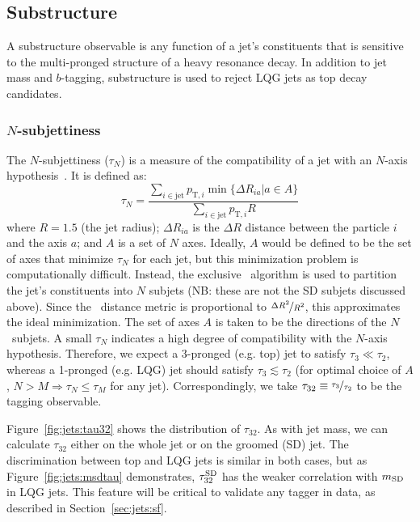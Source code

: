 \subsection{Substructure}

A substructure observable is any function of a jet's constituents that is sensitive to the multi-pronged structure of a heavy resonance decay. 
In addition to jet mass and $b$-tagging, substructure is used to reject LQG jets as top decay candidates. 

\subsubsection{$N$-subjettiness}

The $N$-subjettiness ($\tau_N$) is a measure of the compatibility of a jet with an $N$-axis hypothesis~\needcite.
It is defined as:
\begin{equation}
    \tau_N = \frac{\sum_{i\in\mathrm{jet}} p_{\mathrm{T},i} \min\{\Delta R_{ia} | a\in A\}}{\sum_{i\in\mathrm{jet}} p_{\mathrm{T},i} R}
\end{equation}
where $R=1.5$ (the jet radius); $\Delta R_{ia}$ is the $\Delta R$ distance between the particle $i$ and the axis $a$; and $A$ is a set of $N$ axes. 
Ideally, $A$ would be defined to be the set of axes that minimize $\tau_N$ for each jet, but this minimization problem is computationally difficult.  
Instead, the exclusive \kt~algorithm is used to partition the jet's constituents into $N$ subjets (NB: these are not the SD subjets discussed above).
Since the \kt~distance metric is proportional to $\nicefrac{\Delta R^2}{R^2}$, this approximates the ideal minimization.
The set of axes $A$ is taken to be the directions of the $N$ \kt~subjets. 
A small $\tau_N$ indicates a high degree of compatibility with the $N$-axis hypothesis.
Therefore, we expect a 3-pronged (e.g. top) jet to satisfy $\tau_3 \ll \tau_2$, whereas a 1-pronged (e.g. LQG) jet should satisfy $\tau_3 \lesssim \tau_2$ (for optimal choice of $A$, $N>M \Rightarrow \tau_{N} \leq \tau_{M}$ for any jet). 
Correspondingly, we take $\tau_{32} \equiv \nicefrac{\tau_3}{\tau_2}$ to be the tagging observable. 

Figure~\ref{fig:jets:tau32} shows the distribution of $\tau_{32}$.
As with jet mass, we can calculate $\tau_{32}$ either on the whole jet or on the groomed (SD) jet.
The discrimination between top and LQG jets is similar in both cases, but as Figure~\ref{fig:jets:msdtau} demonstrates, $\tau_{32}^{\mathrm{SD}}$ has the weaker correlation with $m_{\mathrm{SD}}$ in LQG jets. 
This feature will be critical to validate any tagger in data, as described in Section~\ref{sec:jets:sf}.

